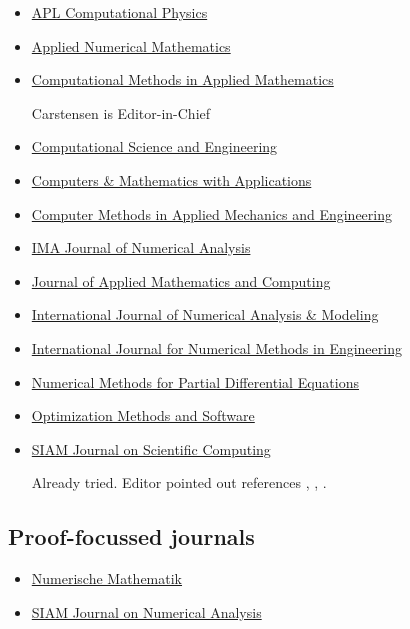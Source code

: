 \documentclass[11pt]{article}
\begin{document}
\begin{itemize}
  \item \href{https://sci.scientific-direct.net/c/1927090/dffc717758ce6f87/8}{APL Computational Physics}
  \item \href{https://www.sciencedirect.com/journal/applied-numerical-mathematics}{Applied Numerical Mathematics}
\item \href{https://www.degruyterbrill.com/journal/key/cmam/html?srsltid=AfmBOoo8WGJxRllInTVAWwmPnu4jpE_REhB_ohFjk93UKvPwxGXhQeir}{Computational Methods in Applied Mathematics}

Carstensen is Editor-in-Chief
\item \href{https://link.springer.com/journal/44207}{Computational Science and Engineering}
\item \href{https://www.sciencedirect.com/journal/computers-and-mathematics-with-applications}{Computers \& Mathematics with Applications}
\item \href{https://www.sciencedirect.com/journal/computer-methods-in-applied-mechanics-and-engineering}{Computer Methods in Applied Mechanics and Engineering}
\item \href{https://academic.oup.com/imajna}{IMA Journal of Numerical Analysis}
\item \href{https://link.springer.com/journal/12190}{Journal of Applied Mathematics and Computing}
\item \href{https://www.math.ualberta.ca/ijnam/}{International Journal of                                                 Numerical Analysis \& Modeling}
\item \href{https://onlinelibrary.wiley.com/journal/10970207}{International Journal for Numerical Methods in Engineering}
\item \href{https://onlinelibrary.wiley.com/journal/10982426}{Numerical Methods for Partial Differential Equations}
\item \href{https://www.tandfonline.com/journals/goms20}{Optimization Methods and Software}
\item \href{https://www.siam.org/publications/siam-journals/siam-journal-on-scientific-computing/}{SIAM Journal on Scientific Computing}

Already tried.  Editor pointed out references \cite{BraessCarstensenHoppe2007}, \cite{CarstensenHu2015}, \cite{Dorfler1996}.
\end{itemize}

\subsection*{Proof-focussed journals}

\begin{itemize}
\item \href{https://link.springer.com/journal/211}{Numerische Mathematik}
\item \href{https://www.siam.org/publications/siam-journals/siam-journal-on-numerical-analysis/}{SIAM Journal on Numerical Analysis}
\end{itemize}
\end{document}
